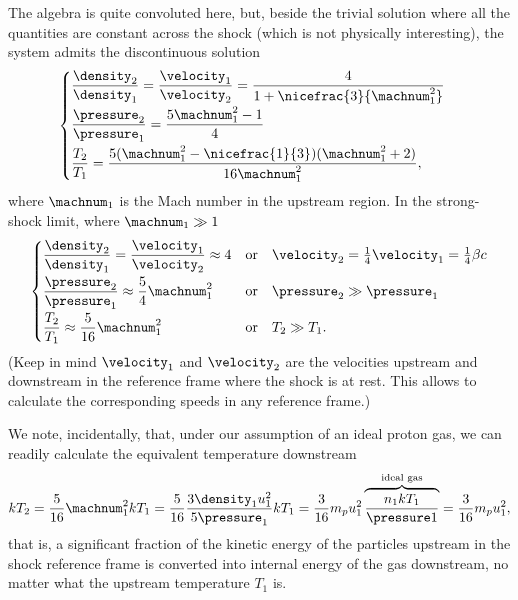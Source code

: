 The algebra is quite convoluted here, but, beside the trivial solution where all
the quantities are constant across the shock (which is not physically interesting),
the system admits the discontinuous solution
\begin{align*}
  \begin{cases}
  \displaystyle\frac{\density_2}{\density_1} = \frac{\velocity_1}{\velocity_2} =
    \frac{4}{1 + \nicefrac{3}{\machnum_1^2}}\\[8pt]
  \displaystyle\frac{\pressure_2}{\pressure_1} =
    \frac{5 \machnum_1^2 - 1}{4}\\[8pt]
  \displaystyle\frac{T_2}{T_1} =
    \frac{5 (\machnum_1^2 - \nicefrac{1}{3}) (\machnum_1^2 + 2)}{16 \machnum_1^2},
  \end{cases}
\end{align*}
where $\machnum_1$ is the Mach number in the upstream region. In the strong-shock
limit, where $\machnum_1 \gg 1$
\begin{align}\label{eq:shock_acceleration_conditions}
  \begin{cases}
  \displaystyle\frac{\density_2}{\density_1} =
  \frac{\velocity_1}{\velocity_2} \approx 4
  & \text{or}\quad \velocity_2 = \frac{1}{4}\velocity_1  = \frac{1}{4} \beta c\\[8pt]
  \displaystyle\frac{\pressure_2}{\pressure_1} \approx \frac{5}{4}\machnum_1^2
  & \text{or}\quad \pressure_2 \gg \pressure_1 \\[8pt]
  \displaystyle\frac{T_2}{T_1} \approx \frac{5}{16}\machnum_1^2
  & \text{or}\quad T_2 \gg T_1.
  \end{cases}
\end{align}
(Keep in mind $\velocity_1$ and $\velocity_2$ are the velocities upstream and
downstream in the reference frame where the shock is at rest. This allows to calculate
the corresponding speeds in any reference frame.)

We note, incidentally, that, under our assumption of an ideal proton gas, we can
readily calculate the equivalent temperature downstream
\begin{align*}
  kT_2 = \frac{5}{16} \machnum_1^2 kT_1 =
  \frac{5}{16} \frac{3 \density_1 u_1^2}{5 \pressure_1} kT_1 =
  \frac{3}{16} m_p u_1^2 \overbrace{\frac{n_1 kT_1}{\pressure 1}}^{\text{ideal gas}} =
  \frac{3}{16} m_p u_1^2,
\end{align*}
that is, a significant fraction of the kinetic energy of the particles upstream
in the shock reference frame is converted into internal energy of the gas downstream,
no matter what the upstream temperature $T_1$ is.

